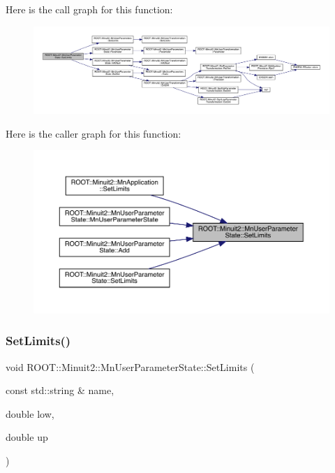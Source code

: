 Here is the call graph for this function\+:\nopagebreak
\begin{figure}[H]
\begin{center}
\leavevmode
\includegraphics[width=350pt]{d3/de0/classROOT_1_1Minuit2_1_1MnUserParameterState_a0552162fb1f4fd9ae1be3ea7839fea5b_cgraph}
\end{center}
\end{figure}
Here is the caller graph for this function\+:\nopagebreak
\begin{figure}[H]
\begin{center}
\leavevmode
\includegraphics[width=350pt]{d3/de0/classROOT_1_1Minuit2_1_1MnUserParameterState_a0552162fb1f4fd9ae1be3ea7839fea5b_icgraph}
\end{center}
\end{figure}
\mbox{\label{classROOT_1_1Minuit2_1_1MnUserParameterState_ab178dda717939b16da948c96d2180b89}} 
\subsubsection{\texorpdfstring{SetLimits()}{SetLimits()}\hspace{0.1cm}{\footnotesize\ttfamily [3/4]}}
{\footnotesize\ttfamily void R\+O\+O\+T\+::\+Minuit2\+::\+Mn\+User\+Parameter\+State\+::\+Set\+Limits (\begin{DoxyParamCaption}\item[{const std\+::string \&}]{name,  }\item[{double}]{low,  }\item[{double}]{up }\end{DoxyParamCaption})}

